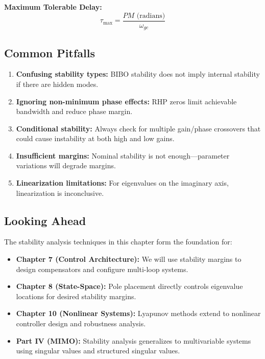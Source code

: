 \textbf{Maximum Tolerable Delay:}
\begin{equation}
\tau_{\max} = \frac{PM \text{ (radians)}}{\omega_{gc}}
\end{equation}

\subsection{Common Pitfalls}

\begin{enumerate}
    \item \textbf{Confusing stability types:} BIBO stability does not imply internal stability if there are hidden modes.

    \item \textbf{Ignoring non-minimum phase effects:} RHP zeros limit achievable bandwidth and reduce phase margin.

    \item \textbf{Conditional stability:} Always check for multiple gain/phase crossovers that could cause instability at both high and low gains.

    \item \textbf{Insufficient margins:} Nominal stability is not enough---parameter variations will degrade margins.

    \item \textbf{Linearization limitations:} For eigenvalues on the imaginary axis, linearization is inconclusive.
\end{enumerate}

\subsection{Looking Ahead}

The stability analysis techniques in this chapter form the foundation for:

\begin{itemize}
    \item \textbf{Chapter 7 (Control Architecture):} We will use stability margins to design compensators and configure multi-loop systems.

    \item \textbf{Chapter 8 (State-Space):} Pole placement directly controls eigenvalue locations for desired stability margins.

    \item \textbf{Chapter 10 (Nonlinear Systems):} Lyapunov methods extend to nonlinear controller design and robustness analysis.

    \item \textbf{Part IV (MIMO):} Stability analysis generalizes to multivariable systems using singular values and structured singular values.
\end{itemize}

